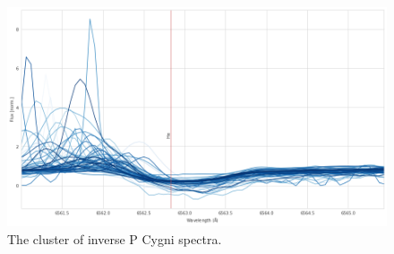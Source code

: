 \begin{figure}[!htb]
\centering
\includegraphics[scale=0.45]{figures/inverse p cygni ensemble.png}
\caption{The cluster of inverse P Cygni spectra.}
\end{figure}


